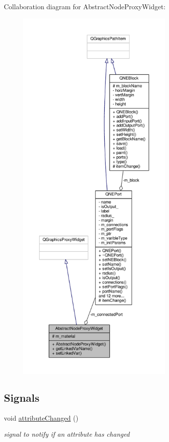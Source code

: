 Collaboration diagram for Abstract\-Node\-Proxy\-Widget\-:
\nopagebreak
\begin{figure}[H]
\begin{center}
\leavevmode
\includegraphics[height=550pt]{class_abstract_node_proxy_widget__coll__graph}
\end{center}
\end{figure}
\subsection*{Signals}
\begin{DoxyCompactItemize}
\item 
\hypertarget{class_abstract_node_proxy_widget_a503fe31eb1e4ff86ee211c18bb11a46e}{void \hyperlink{class_abstract_node_proxy_widget_a503fe31eb1e4ff86ee211c18bb11a46e}{attribute\-Changed} ()}\label{class_abstract_node_proxy_widget_a503fe31eb1e4ff86ee211c18bb11a46e}

\begin{DoxyCompactList}\small\item\em signal to notify if an attribute has changed \end{DoxyCompactList}\end{DoxyCompactItemize}
